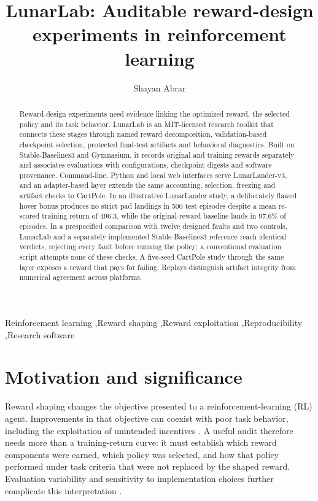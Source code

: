 \documentclass[preprint,12pt]{elsarticle}
\begin{document}
\begin{frontmatter}
\title{LunarLab: Auditable reward-design experiments in reinforcement learning}
\author[aiub]{Shayan Abrar}
\begin{abstract}
Reward-design experiments need evidence linking the optimized reward, the selected policy and its task behavior. LunarLab is an MIT-licensed research toolkit that connects these stages through named reward decomposition, validation-based checkpoint selection, protected final-test artifacts and behavioral diagnostics. Built on Stable-Baselines3 and Gymnasium, it records original and training rewards separately and associates evaluations with configurations, checkpoint digests and software provenance. Command-line, Python and local web interfaces serve LunarLander-v3, and an adapter-based layer extends the same accounting, selection, freezing and artifact checks to CartPole. In an illustrative LunarLander study, a deliberately flawed hover bonus produces no strict pad landings in 500 test episodes despite a mean re-scored training return of 496.3, while the original-reward baseline lands in 97.6\% of episodes. In a prespecified comparison with twelve designed faults and two controls, LunarLab and a separately implemented Stable-Baselines3 reference reach identical verdicts, rejecting every fault before running the policy; a conventional evaluation script attempts none of these checks. A five-seed CartPole study through the same layer exposes a reward that pays for failing. Replays distinguish artifact integrity from numerical agreement across platforms.
\end{abstract}
\begin{keyword}
Reinforcement learning \sep Reward shaping \sep Reward exploitation \sep Reproducibility \sep Research software
\end{keyword}
\end{frontmatter}

\section{Motivation and significance}
Reward shaping changes the objective presented to a reinforcement-learning (RL) agent. Improvements in that objective can coexist with poor task behavior, including the exploitation of unintended incentives \citep{skalse2022gaming}. A useful audit therefore needs more than a training-return curve: it must establish which reward components were earned, which policy was selected, and how that policy performed under task criteria that were not replaced by the shaped reward. Evaluation variability and sensitivity to implementation choices further complicate this interpretation \citep{henderson2018matters,agarwal2021precipice}.
\end{document}

